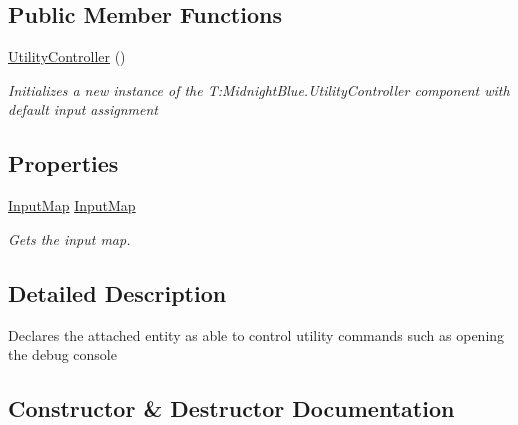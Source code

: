 \subsection*{Public Member Functions}
\begin{DoxyCompactItemize}
\item 
\hyperlink{class_m_b2_d_1_1_entity_component_1_1_utility_controller_a161534f361fd2f0f734fb27c58c50cf9}{Utility\+Controller} ()
\begin{DoxyCompactList}\small\item\em Initializes a new instance of the T\+:\+Midnight\+Blue.\+Utility\+Controller component with default input assignment \end{DoxyCompactList}\end{DoxyCompactItemize}
\subsection*{Properties}
\begin{DoxyCompactItemize}
\item 
\hyperlink{class_m_b2_d_1_1_i_o_1_1_input_map}{Input\+Map} \hyperlink{class_m_b2_d_1_1_entity_component_1_1_utility_controller_a33211d8d414f44a6c320db8f73623882}{Input\+Map}
\begin{DoxyCompactList}\small\item\em Gets the input map. \end{DoxyCompactList}\end{DoxyCompactItemize}


\subsection{Detailed Description}
Declares the attached entity as able to control utility commands such as opening the debug console 



\subsection{Constructor \& Destructor Documentation}
\hypertarget{class_m_b2_d_1_1_entity_component_1_1_utility_controller_a161534f361fd2f0f734fb27c58c50cf9}{}\label{class_m_b2_d_1_1_entity_component_1_1_utility_controller_a161534f361fd2f0f734fb27c58c50cf9} 
